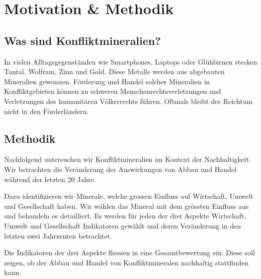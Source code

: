 \section{Motivation & Methodik}\label{sec:motivation}

\subsection{Was sind Konfliktmineralien?}

In vielen Alltagsgegenständen wie Smartphones, Laptops oder Glühbirnen stecken Tantal, Wolfram, Zinn und Gold. Diese Metalle werden aus abgebauten Mineralien gewonnen. Förderung und Handel solcher Mineralien in Konfliktgebieten können zu schweren Menschenrechtsverletzungen und Verletzungen des humanitären Völkerrechts führen. Oftmals bleibt der Reichtum nicht in den Förderländern.
~\cite{definiti26:online}

\subsection{Methodik}

Nachfolgend untersuchen wir Konfliktmineralien im Kontext der Nachhaltigkeit. Wir betrachten die Veränderung der Auswirkungen von Abbau und Handel während der letzten 20 Jahre.

Dazu identifizieren wir Minerale, welche grossen Einfluss auf Wirtschaft, Umwelt und Gesellschaft haben. Wir wählen das Mineral mit dem grössten Einfluss aus und behandeln es detailliert. Es werden für jeden der drei Aspekte Wirtschaft, Umwelt und Gesellschaft Indikatoren gewählt und deren Veränderung in den letzten zwei Jahrzenten betrachtet.

Die Indikatoren der drei Aspekte fliessen in eine Gesamtbewertung ein. Diese soll zeigen, ob der Abbau und Handel von Konfliktmineralen nachhaltig stattfinden kann.
